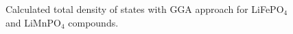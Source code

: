 \begin{figure}[h]
\begin{minipage}[h]{0.49\linewidth}
\end{minipage}
\hfill
\begin{minipage}[ht]{0.49\linewidth}
\end{minipage}
\caption{Calculated total density of states with GGA approach for LiFePO$_4$ and LiMnPO$_4$ compounds.}
\label{ris:bs}
\end{figure}


